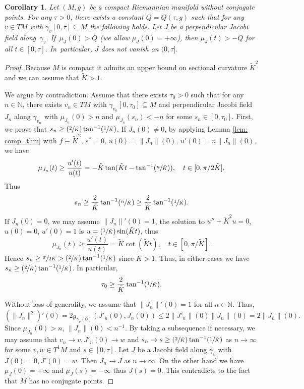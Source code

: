 \documentclass[10pt]{amsart}
\newcommand{\Psfrac}[2]{(\sfrac{#1}{#2})}
\newtheorem{corollary}[theorem]{Corollary}
\theoremstyle{definition}
\renewcommand{\>}{{\rangle}}
\newcommand{\<}{{\langle}}
\begin{document}
\begin{corollary}\label{cor: bdd_time_bdd_mu}
Let $(M, g)$ be a compact Riemannian manifold without conjugate points. For any $\tau>0$, there exists a constant $Q=Q(\tau, g)$ such that for any $v\in TM$ with $\gamma_v[0,\tau]\subseteq M$ the following holds. Let $J$ be a perpendicular Jacobi field along~$\gamma_v$. If~$\mu_J(0)>Q$ (we allow $\mu_J(0)=+\infty$), then $\mu_J(t)>-Q$ for all $t\in[0,\tau]$. In~particular, $J$ does not vanish on $(0,\tau]$.
\end{corollary}
\begin{proof}
Because $M$ is compact it admits an upper bound on sectional curvature $\tilde{K}^2$ and we can assume that $\tilde K>1$.

We argue by contradiction. Assume that there exists $\tau_0>0$ such that for any $n\in\mathbb N$, there exists $v_n\in TM$ with $\gamma_{v_n}[0,\tau_0]\subseteq M$ and perpendicular Jacobi field $J_n$ along $\gamma_{v_n}$ with $\mu_{J_n}(0)>n$ and $\mu_{J_n}(s_n)<-n$ for some $s_n\in[0,\tau_0]$. First, we prove that $s_n\geq \Psfrac{2}{\tilde K}\tan^{-1}\Psfrac{1}{\tilde K}$. If $J_n(0)\neq 0$, by applying Lemma \ref{lem: comp_thm} with $f\equiv \tilde{K}^2$, $s^*=0$, $u(0)=\|J_n\|(0)$, $u'(0)=n\|J_n\|(0)$, we have
\[
\mu_{J_n}(t)\geq \frac{u'(t)}{u(t)}=-\tilde{K}\tan(\tilde{K}t-\tan^{-1}\Psfrac{n}{\tilde{K}}), \quad t\in [0,\pi/2\tilde{K}].
\]
Thus
\[
s_n\geq \frac{2}{\tilde K}\tan^{-1}\Psfrac{n}{\tilde K}\geq \frac{2}{\tilde K}\tan^{-1}\Psfrac{1}{\tilde K}.
\]
If $J_n(0)= 0$, we may assume $\|J_n\|'(0)=1$, the solution to $u''+\tilde{K}^2u=0$, $u(0)=0$, $u'(0)=1$ is $u=\Psfrac{1}{\tilde K}\sin(\tilde{K}t)$, thus
\[
\mu_{J_n}(t)\geq \frac{u'(t)}{u(t)}=\tilde K \cot(\tilde{K}t), \quad t\in [0,\pi/\tilde{K}].
\]
Hence $s_n\geq \sfrac{\pi}{2\tilde{K}}>\Psfrac{2}{\tilde K}\tan^{-1}\Psfrac{1}{\tilde K}$ since $\tilde{K}>1$. Thus, in either cases we have $s_n\geq \Psfrac{2}{\tilde K}\tan^{-1}\Psfrac{1}{\tilde K}$. In particular,
\[
\tau_0\geq \frac{2}{\tilde K}\tan^{-1}\Psfrac{1}{\tilde K}.
\]

Without loss of generality, we assume that $\|J_n\|'(0)=1$ for all $n\in\mathbb N$. Thus,
\begin{equation*}
\left(\|J_n\|^2\right)'(0)=2g_{\gamma_v(0)}(J'_n(0), J_n(0))\leq 2\| J'_n\|(0)\|J_n\|(0)= 2\|J_n\|(0).
\end{equation*}
Since $\mu_{J_n}(0)>n$, $\|J_n\|(0)< n^{-1}$. By taking a subsequence if necessary, we may assume that $v_n\to v, J'_n(0)\to w$ and $s_n\to s\geq \Psfrac{2}{\tilde K}\tan^{-1}\Psfrac{1}{\tilde K}$ as $n\to\infty$ for some $v,w\in T^1M$ and $s\in[0,\tau]$. Let $J$ be a Jacobi field along $\gamma_v$ with $J(0)=0, J'(0)=w$. Then $J_n\to J$ as $n\to\infty$. On the other hand we have $\mu_J(0)=+\infty$ and $\mu_J(s)=-\infty$ thus $J(s)=0$. This contradicts to the fact that $M$ has no conjugate points.
\end{proof}
\end{document}
